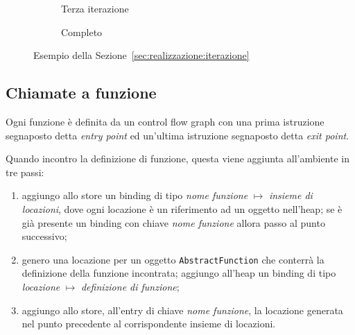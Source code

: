 \begin{figure}[htbp]
\begin{subfigure}{.8\linewidth}
        \caption{Terza iterazione}
        \label{fig:realizzazione:while-2}
    \end{subfigure}%
    \begin{subfigure}{.8\linewidth}
        \centering
        \caption{Completo}
        \label{fig:realizzazione:while-2}
    \end{subfigure}%
    \caption{Esempio della Sezione~\ref{sec:realizzazione:iterazione}}
    \label{fig:realizzazione:iterazione}
\end{figure}

\subsection{Chiamate a funzione}\label{sec:callstring}

Ogni funzione è definita da un control flow graph con una prima istruzione segnaposto detta \emph{entry point} ed un'ultima istruzione segnaposto detta \emph{exit point}.

Quando incontro la definizione di funzione, questa viene aggiunta all'ambiente in tre passi:
\begin{enumerate}
    \item aggiungo allo store un binding di tipo \emph{nome funzione} $\mapsto$ \emph{insieme di locazioni}, dove ogni locazione è un riferimento ad un oggetto nell'heap; se è già presente un binding con chiave \emph{nome funzione} allora passo al punto successivo;
    \item genero una locazione per un oggetto \texttt{AbstractFunction} che conterrà la definizione della funzione incontrata; aggiungo all'heap un binding di tipo \emph{locazione} $\mapsto$ \emph{definizione di funzione};
    \item aggiungo allo store, all'entry di chiave \emph{nome funzione}, la locazione generata nel punto precedente al corrispondente insieme di locazioni.
\end{enumerate}

